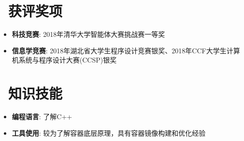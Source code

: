 \documentclass[utf8,letterpaper,11pt]{ctexart}
\newcommand{\resumeItem}[2]{
  \item\small{
    \textbf{#1}{: #2 \vspace{-2pt}}
  }
}
\newcommand{\resumeSubItem}[2]{\resumeItem{#1}{#2}\vspace{-4pt}}
\newcommand{\resumeSubHeadingListStart}{\begin{itemize}[leftmargin=*]}
\newcommand{\resumeSubHeadingListEnd}{\end{itemize}}
\begin{document}
\section{\faAward \ 获评奖项}
  \resumeSubHeadingListStart
    \resumeSubItem{科技竞赛}
    {2018年清华大学智能体大赛挑战赛一等奖}
    \resumeSubItem{信息学竞赛}
    {2018年湖北省大学生程序设计竞赛银奖、2018年CCF大学生计算机系统与程序设计大赛(CCSP)银奖}
  \resumeSubHeadingListEnd
\vspace{1pt}
\section{\faCog \ 知识技能}
  \resumeSubHeadingListStart
    \resumeSubItem{编程语言}
    {了解C++}
    \resumeSubItem{工具使用}
    {较为了解容器底层原理，具有容器镜像构建和优化经验}
  \resumeSubHeadingListEnd
\end{document}

